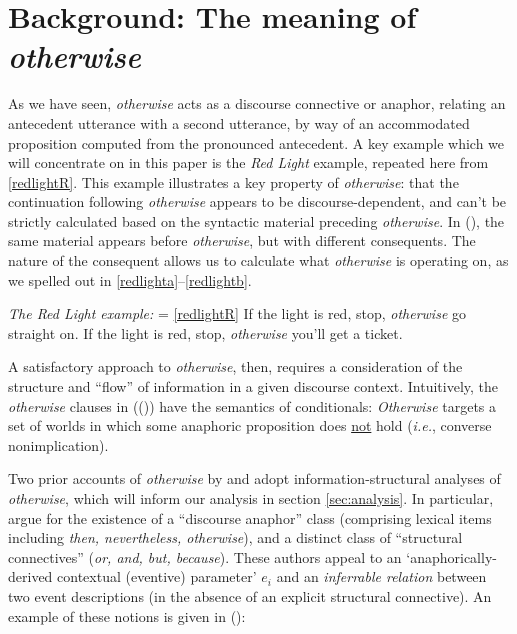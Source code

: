 

\section{Background: The meaning of \textit{otherwise}}
\label{sec:background}

As we have seen, \textit{otherwise} acts as a discourse connective or anaphor, relating an antecedent utterance with a second utterance, by way of an accommodated proposition computed from the pronounced antecedent. A key example which we will concentrate on in this paper is the \textit{Red Light} example, repeated here from \ref{redlightR}. This example illustrates a key property of \textit{otherwise}: that the continuation following \textit{otherwise} appears to be discourse-dependent, and can't be strictly calculated based on the syntactic material preceding \textit{otherwise}. In (\nextx), the same material appears before \textit{otherwise}, but with different consequents. The nature of the consequent allows us to calculate what \textit{otherwise} is operating on, as we spelled out in \ref{redlighta}--\ref{redlightb}.

\pex  \textit{The Red Light example:} \hfill = \ref{redlightR}
\a  If the light is red, stop, \textit{otherwise} go straight on.
\a  If the light is red, stop, \textit{otherwise} you'll get a ticket.\xe


A satisfactory approach to \textit{otherwise}, then, requires a consideration of the structure and ``flow'' of information in a given discourse context. Intuitively, the \textit{otherwise} clauses in ((\lastx)) have the semantics of conditionals: \textit{Otherwise} targets a set of worlds in which some anaphoric proposition does \ul{not} hold (\textit{i.e.}, converse nonimplication). 

Two prior accounts of \textit{otherwise} by \citet{Webber2001} and \citet{Kruijff-Korbayova2001} adopt information-structural analyses of \textit{otherwise}, which will inform our analysis in section \ref{sec:analysis}. In particular, \citeauthor{Webber2001} argue for the existence of a ``discourse anaphor'' class (comprising lexical items including \textit{then, nevertheless, otherwise}), and a distinct class of ``structural connectives'' (\textit{or, and, but, because}). These authors appeal to an `anaphorically-derived contextual (eventive) parameter' $ e_i $ and an \textit{inferrable relation} between two event descriptions (in the absence of an explicit structural connective). An example of these notions is given in (\nextx): 

